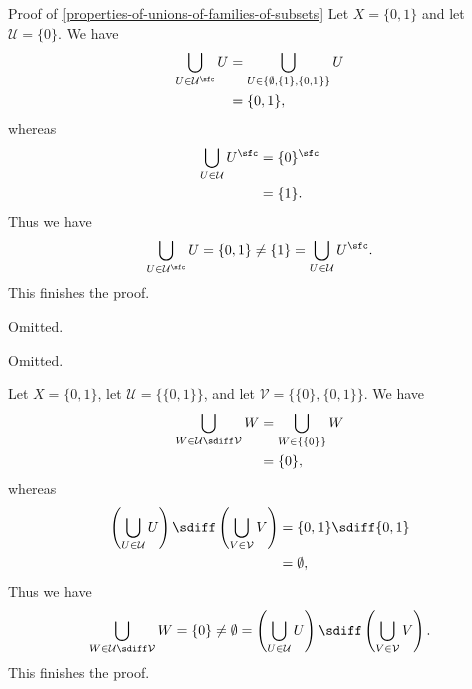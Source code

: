 \begin{Proof}{Proof of \cref{properties-of-unions-of-families-of-subsets}}
    Let $X=\{0,1\}$ and let $\mathcal{U}=\{0\}$. We have
    \begin{align*}
        \bigcup_{U\in\mathcal{U}^{\sfc}}U &= \bigcup_{U\in\{\emptyset,\{1\},\{0,1\}\}}U\\
                                          &= \{0,1\},
    \end{align*}
    whereas
    \begin{align*}
        \bigcup_{U\in\mathcal{U}}U^{\sfc} &= \{0\}^{\sfc}\\
                                          &= \{1\}.
    \end{align*}
    Thus we have
    \[
        \bigcup_{U\in\mathcal{U}^{\sfc}}U%
        =%
        \{0,1\}%
        \neq%
        \{1\}%
        =%
        \bigcup_{U\in\mathcal{U}}U^{\sfc}.%
    \]%
    This finishes the proof.

    Omitted.

    Omitted.

    Let $X=\{0,1\}$, let $\mathcal{U}=\{\{0,1\}\}$, and let $\mathcal{V}=\{\{0\},\{0,1\}\}$. We have
    \begin{align*}
        \bigcup_{W\in\mathcal{U}\sdiff\mathcal{V}}W &= \bigcup_{W\in\{\{0\}\}}W\\
                                                    &= \{0\},
    \end{align*}
    whereas
    \begin{align*}
        \left(\bigcup_{U\in\mathcal{U}}U\right)\sdiff\left(\bigcup_{V\in\mathcal{V}}V\right) &= \{0,1\}\sdiff\{0,1\}\\
                                                                                             &= \emptyset,
    \end{align*}
    Thus we have
    \[
        \bigcup_{W\in\mathcal{U}\sdiff\mathcal{V}}W%
        =%
        \{0\}%
        \neq%
        \emptyset%
        =%
        \left(\bigcup_{U\in\mathcal{U}}U\right)\sdiff\left(\bigcup_{V\in\mathcal{V}}V\right).%
    \]%
    This finishes the proof.


\end{Proof}
